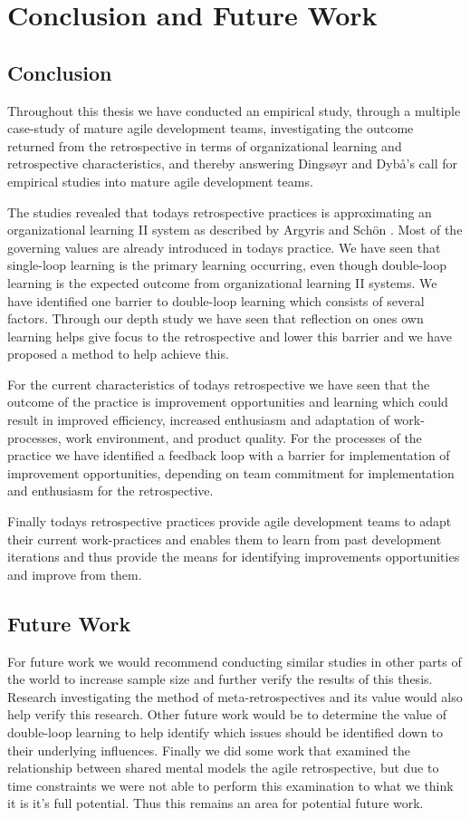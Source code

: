 \chapter{Conclusion and Future Work}
\section{Conclusion}
Throughout this thesis we have conducted an empirical study, through a multiple case-study of mature agile development teams, investigating the outcome returned from the retrospective in terms of organizational learning and retrospective characteristics, and thereby answering Dingsøyr and Dybå’s call \cite{Dyba2008} for empirical studies into mature agile development teams.

The studies revealed that todays retrospective practices is approximating an organizational learning II system as described by Argyris and Schön \cite{Argyris1996}. Most of the governing values are already introduced in todays practice. We have seen that single-loop learning is the primary learning occurring, even though double-loop learning is the expected outcome from organizational learning II systems. We have identified one barrier to double-loop learning which consists of several factors. Through our depth study we have seen that reflection on ones own learning helps give focus to the retrospective and lower this barrier and we have proposed a method to help achieve this. 

For the current characteristics of todays retrospective we have seen that the outcome of the practice is improvement opportunities and learning which could result in improved efficiency, increased enthusiasm and adaptation of work-processes, work environment, and product quality. For the processes of the practice we have identified a feedback loop with a barrier for implementation of improvement opportunities, depending on team commitment for implementation and enthusiasm for the retrospective. 

Finally todays retrospective practices provide agile development teams to adapt their current work-practices and enables them to learn from past development iterations and thus provide the means for identifying improvements opportunities and improve from them. 

\section{Future Work}
For future work we would recommend conducting similar studies in other parts of the world to increase sample size and further verify the results of this thesis. Research investigating the method of meta-retrospectives and its value would also help verify this research. Other future work would be to determine the value of double-loop learning to help identify which issues should be identified down to their underlying influences. Finally we did some work that examined the relationship between shared mental models the agile retrospective, but due to time constraints we were not able to perform this examination to what we think it is it's full potential. Thus this remains an area for potential future work.

